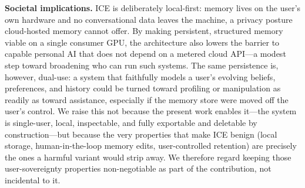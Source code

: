 \documentclass[10pt]{article}
\begin{document}
\textbf{Societal implications.} ICE is deliberately local-first: memory lives on the user's own hardware and no conversational data leaves the machine, a privacy posture cloud-hosted memory cannot offer. By making persistent, structured memory viable on a single consumer GPU, the architecture also lowers the barrier to capable personal AI that does not depend on a metered cloud API---a modest step toward broadening who can run such systems. The same persistence is, however, dual-use: a system that faithfully models a user's evolving beliefs, preferences, and history could be turned toward profiling or manipulation as readily as toward assistance, especially if the memory store were moved off the user's control. We raise this not because the present work enables it---the system is single-user, local, inspectable, and fully exportable and deletable by construction---but because the very properties that make ICE benign (local storage, human-in-the-loop memory edits, user-controlled retention) are precisely the ones a harmful variant would strip away. We therefore regard keeping those user-sovereignty properties non-negotiable as part of the contribution, not incidental to it.
\end{document}
